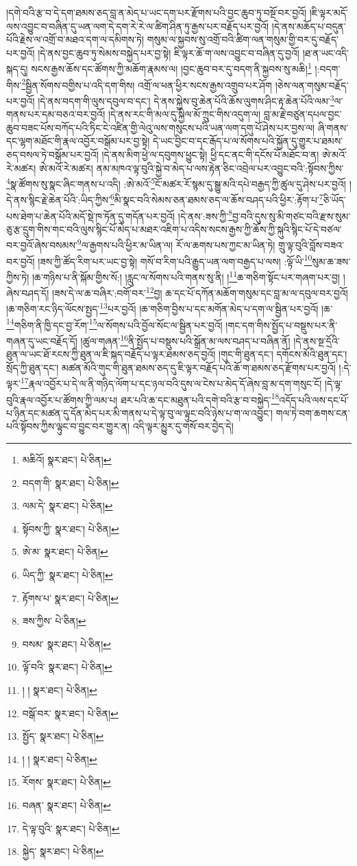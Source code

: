 །དགེ་བའི་རྩ་བ་དེ་དག་ཐམས་ཅད་བླ་ན་མེད་པ་ཡང་དག་པར་རྫོགས་པའི་བྱང་ཆུབ་ཏུ་བསྔོ་བར་བྱའོ། །ཇི་ལྟར་མདོ་ལས་འབྱུང་བ་བཞིན་དུ་ཡན་ལག་དེ་དག་རེ་རེ་ལ་ཚིག་ཤིན་ཏུ་རྒྱས་པར་བརྗོད་པར་བྱའོ། །དེ་ནས་མཆོད་པ་བདུན་པོའི་རྗེས་ལ་འགྲོ་བ་མཐའ་དག་ལ་དམིགས་ཏེ། གསུམ་ལ་སྐྱབས་སུ་འགྲོ་བའི་ཚིག་ལན་གསུམ་གྱི་བར་དུ་བརྗོད་པར་བྱའོ། །དེ་ནས་བྱང་ཆུབ་ཏུ་སེམས་བསྐྱེད་པར་བྱ་སྟེ། ཇི་ལྟར་ཆོ་ག་ལས་འབྱུང་བ་བཞིན་དུ་བྱའོ། །ཐ་ན་ཡང་འདི་སྐད་དུ། སངས་རྒྱས་ཆོས་དང་ཚོགས་ཀྱི་མཆོག་རྣམས་ལ། །བྱང་ཆུབ་བར་དུ་བདག་ནི་སྐྱབས་སུ་མཆི།\footnote{མཆིའོ།  སྣར་ཐང་།  པེ་ཅིན། } །:བདག་གིས་\footnote{བདག་གི་  སྣར་ཐང་།  པེ་ཅིན། }སྦྱིན་སོགས་བགྱིས་པ་འདི་དག་གིས། འགྲོ་ལ་ཕན་ཕྱིར་སངས་རྒྱས་འགྲུབ་པར་ཤོག །ཅེས་ལན་གསུམ་བརྗོད་པར་བྱའོ། །དེ་ནས་བདག་གི་ལུས་དབུལ་བ་དང་། དེ་ནས་སྐྱེས་བུ་ཆེན་པོའི་ཆོས་ལུགས་ཤིང་རྟ་ཆེན་པོའི་ལམ་\footnote{ལམ་དེ་  སྣར་ཐང་།  པེ་ཅིན། }ལ་གནས་པར་དམ་བཅའ་བར་བྱའོ། །དེ་ནས་རང་གི་མལ་དུ་སྐྱིལ་མོ་ཀྲུང་གིས་འདུག་ལ། བླ་མ་རྗེ་བཙུན་དཔལ་བྱང་ཆུབ་བཟང་པོས་བཀོད་པའི་ཏིང་ངེ་འཛིན་གྱི་ལེའུ་ལས་གསུངས་པའི་ཡན་ལག་དགུ་པོ་ཤེས་པར་བྱས་ལ། ཞི་གནས་དང་ལྷག་མཐོང་གི་རྣལ་འབྱོར་བསྒོམ་པར་བྱ་སྟེ། དེ་ཡང་བྱིང་བ་དང་རྒོད་པ་ལ་སོགས་པའི་སྐྱོན་དུ་གྱུར་པ་ཐམས་ཅད་བསལ་ཏེ་བསྒོམ་པར་བྱའོ། །དེ་ནས་མིག་ཕྱེ་ལ་དབུགས་ཕྱུང་སྟེ། ཕྱི་དང་ནང་གི་དངོས་པོ་མཐོང་བ་ན། ཨེ་མའོ་རེ་མཚར། ཨེ་མའོ་རེ་མཚར། ནམ་མཁའ་ལྟ་བུའི་སྐྱེ་བ་མེད་པ་ལས་རྟེན་ཅིང་འབྲེལ་པར་འབྱུང་བའི་:སྟོབས་ཀྱིས་\footnote{སྟོབས་ཀྱི་  སྣར་ཐང་།  པེ་ཅིན། }སྣ་ཚོགས་སུ་སྣང་ཞིང་གནས་པ་འདི། :ཨེ་མའོ་\footnote{ཨེ་མ་  སྣར་ཐང་།  པེ་ཅིན། }ངོ་མཚར་རོ་སྙམ་དུ་སྒྱུ་མའི་དཔེ་བརྒྱད་ཀྱི་ཚུལ་དུ་ཤེས་པར་བྱའོ། །དེ་ནས་སྙིང་རྗེ་ཆེན་པོའི་:ཡིད་ཀྱིས་\footnote{ཡིད་ཀྱི་  སྣར་ཐང་།  པེ་ཅིན། }མི་སྣང་བའི་སེམས་ཅན་ཐམས་ཅད་ལ་ཆོས་བཤད་པའི་ཕྱིར་:རྟོག་པ་\footnote{རྟོགས་པ་  སྣར་ཐང་།  པེ་ཅིན། }ཅི་ཡོད་པས་ཐེག་པ་ཆེན་པོའི་མདོ་སྡེ་ཁ་ཏོན་དུ་གདོན་པར་བྱའོ། །དེ་ནས་:ཟས་ཀྱི་\footnote{ཟས་ཀྱིས་  པེ་ཅིན། }བྱ་བའི་དུས་སུ་མི་གཙང་བའི་རྫས་སུམ་ཅུ་རྩ་དྲུག་གིས་གང་བའི་ལུས་སྙིང་པོ་མེད་པ་མཐར་འཇིག་པ་འདིས་སངས་རྒྱས་ཀྱི་ཆོས་ཀྱི་སྐུའི་སྙིང་པོ་དེ་བཙལ་བར་བྱའོ་ཞེས་བསམས་\footnote{བསམ་  སྣར་ཐང་།  པེ་ཅིན། }ལ་རྒྱགས་པའི་ཕྱིར་མ་ཡིན་ལ། རོ་ལ་ཆགས་པས་ཀྱང་མ་ཡིན་ཏེ། གྲུ་ལྟ་བུའི་བློས་བཟའ་བར་བྱའོ། །ཟས་ཀྱི་ཚོད་རིག་པར་ཡང་བྱ་སྟེ། གསོ་བ་རིག་པའི་རྒྱུད་ཡན་ལག་བརྒྱད་པ་ལས། :ལྟོ་ཡི་\footnote{ལྟོ་བའི་  སྣར་ཐང་།  པེ་ཅིན། }སུམ་ཆ་ཟས་ཀྱིས་ཏེ། །ཆ་གཉིས་པ་ནི་སྐོམ་གྱིས་སོ:། །རླུང་ལ་སོགས་པའི་གནས་སུ་ནི། །\footnote{། །  སྣར་ཐང་།  པེ་ཅིན། }ཆ་གཅིག་སྟོང་པར་གཞག་པར་བྱ། །ཞེས་བཤད་དོ། །ཟས་དེ་ལ་ཆ་བཞིར་:བགོ་བར་\footnote{བསྒོ་བར་  སྣར་ཐང་།  པེ་ཅིན། }བྱ། ཆ་དང་པོ་དཀོན་མཆོག་གསུམ་དང་བླ་མ་ལ་དབུལ་བར་བྱའོ། །ཆ་གཅིག་རང་ཉིད་ལོངས་སྤྱད་\footnote{སྤྱོད་  སྣར་ཐང་།  པེ་ཅིན། }པར་བྱའོ། །ཆ་གཅིག་བྱིས་པ་དང་མགོན་མེད་པ་དག་ལ་སྦྱིན་པར་བྱའོ། །ཆ་\footnote{། །  སྣར་ཐང་།  པེ་ཅིན། }གཅིག་ནི་ཁྱི་དང་བྱ་རོག་\footnote{རོགས་  སྣར་ཐང་།  པེ་ཅིན། }ལ་སོགས་པའི་བྱོལ་སོང་ལ་སྦྱིན་པར་བྱའོ། །གང་དག་གིས་སྤྱོད་པ་བསྡུས་པར་ནི་གཞན་དུ་ཡང་བརྗོད་དོ། །ཚུལ་གཞན་\footnote{བཞན་  སྣར་ཐང་།  པེ་ཅིན། }ནི་སྤྱོད་པ་བསྡུས་པའི་སྒྲོན་མ་ལས་བཤད་པ་བཞིན་ནོ། །དེ་ནས་སྔ་དྲོའི་ཐུན་ལ་ཡང་ཐོ་རངས་ཀྱི་ཐུན་ལ་ཇི་སྐད་བརྗོད་པ་ལྟར་ཐམས་ཅད་བྱའོ། །གུང་གི་ཐུན་དང་། དགོངས་མོའི་ཐུན་དང་། སྲོད་ཀྱི་ཐུན་དང་། མཚན་མོའི་གུང་གི་ཐུན་ཐམས་ཅད་དུ་ཇི་ལྟར་བརྗོད་པའི་ཆོ་ག་ཐམས་ཅད་རྫོགས་པར་བྱའོ། །:དེ་ལྟར་\footnote{དེ་ལྟ་བུའི་  སྣར་ཐང་།  པེ་ཅིན། }རྣལ་འབྱོར་པ་དེ་ལ་ནི་གཉིད་ལོག་པ་དང་ཉལ་བའི་དུས་ལ་ངེས་པ་མེད་དོ་ཞེས་བླ་མ་དག་གསུང་ངོ། །དེ་ལྟ་བུའི་རྣལ་འབྱོར་པ་ཚོགས་ཀྱི་ལམ་པ། ཐར་པའི་ཆ་དང་མཐུན་པའི་དགེ་བའི་རྩ་བ་བསྐྱེད་\footnote{སྐྱེད་  སྣར་ཐང་།  པེ་ཅིན། }འདོད་པའི་ལས་དང་པོ་པ་ཉིན་དང་མཚན་དུ་དོན་མེད་པར་མི་གནས་པ་དེ་ལྟ་བུ་ལ་ལྟུང་བའི་ཉེས་པ་ག་ལ་འབྱུང་། གལ་ཏེ་བག་ཆགས་ངན་པའི་སྟོབས་ཀྱིས་ལྟུང་བ་བྱུང་བར་གྱུར་ན། འདི་ལྟར་མྱུར་དུ་གསོ་བར་བྱེད་དེ། 